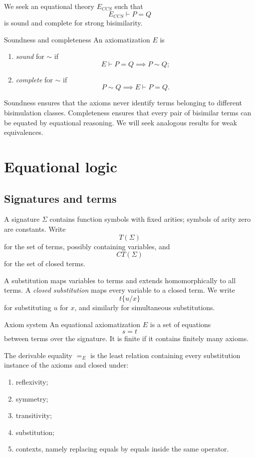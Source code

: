 \documentclass[a4paper]{article}
\begin{document}
We seek an equational theory \(E_{CCS}\) such that
\[
    E_{CCS}\vdash P=Q
\]
is sound and complete for strong bisimilarity.

\begin{snippetdefinition}{Soundness and completeness}
    An axiomatization \(E\) is
    \begin{enumerate}
        \item \emph{sound} for \(\sim\) if
        \[
            E\vdash P=Q
            \implies
            P\sim Q;
        \]
        \item \emph{complete} for \(\sim\) if
        \[
            P\sim Q
            \implies
            E\vdash P=Q.
        \]
    \end{enumerate}
\end{snippetdefinition}

Soundness ensures that the axioms never identify terms belonging to different bisimulation classes.
Completeness ensures that every pair of bisimilar terms can be equated by equational reasoning.
We will seek analogous results for weak equivalences.

\section{Equational logic}

\subsection{Signatures and terms}

A signature \(\Sigma\) contains function symbols with fixed arities; symbols of arity zero are constants.
Write
\[
    T(\Sigma)
\]
for the set of terms, possibly containing variables, and
\[
    CT(\Sigma)
\]
for the set of closed terms.

A substitution maps variables to terms and extends homomorphically to all terms.
A \emph{closed substitution} maps every variable to a closed term.
We write
\[
    t\{u/x\}
\]
for substituting \(u\) for \(x\), and similarly for simultaneous substitutions.

\begin{snippetdefinition}{Axiom system}
    An equational axiomatization \(E\) is a set of equations
    \[
        s=t
    \]
    between terms over the signature.
    It is finite if it contains finitely many axioms.
\end{snippetdefinition}

The derivable equality \(=_E\) is the least relation containing every substitution instance of the axioms and closed under:
\begin{enumerate}
    \item reflexivity;
    \item symmetry;
    \item transitivity;
    \item substitution;
    \item contexts, namely replacing equals by equals inside the same operator.
\end{enumerate}
\end{document}
